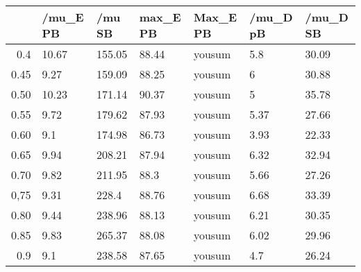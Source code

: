 \begin{table}[ht]
\centering
\begin{tabular}{rllllll}
  \hline
 & /mu\_E PB & /mu SB & max\_E PB & Max\_E PB & /mu\_D pB & /mu\_D SB \\ 
  \hline
0.4 & 10.67 & 155.05 & 88.44 & yousum & 5.8 & 30.09 \\ 
  0.45 & 9.27 & 159.09 & 88.25 & yousum & 6 & 30.88 \\ 
  0.50 & 10.23 & 171.14 & 90.37 & yousum & 5 & 35.78 \\ 
  0.55 & 9.72 & 179.62 & 87.93 & yousum & 5.37 & 27.66 \\ 
  0.60 & 9.1 & 174.98 & 86.73 & yousum & 3.93 & 22.33 \\ 
  0.65 & 9.94 & 208.21 & 87.94 & yousum & 6.32 & 32.94 \\ 
  0.70 & 9.82 & 211.95 & 88.3 & yousum & 5.66 & 27.26 \\ 
  0,75 & 9.31 & 228.4 & 88.76 & yousum & 6.68 & 33.39 \\ 
  0.80 & 9.44 & 238.96 & 88.13 & yousum & 6.21 & 30.35 \\ 
  0.85 & 9.83 & 265.37 & 88.08 & yousum & 6.02 & 29.96 \\ 
  0.9 & 9.1 & 238.58 & 87.65 & yousum & 4.7 & 26.24 \\ 
   \hline
\end{tabular}
\end{table}
